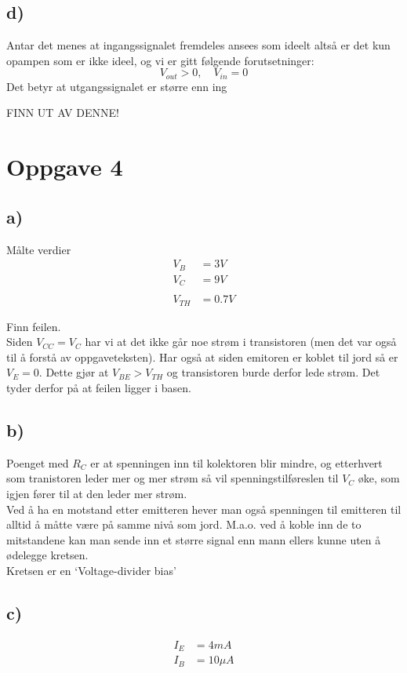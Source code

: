 \documentclass[a4paper, norsk, twoside, 10pt]{article}
\begin{document}
\subsection*{d)}
Antar det menes at ingangssignalet fremdeles ansees som ideelt altså er det kun opampen som er ikke ideel, og vi er gitt følgende forutsetninger: \[V_{out} > 0, \quad V_{in} = 0\]
Det betyr at utgangssignalet er større enn ing


FINN UT AV DENNE!



\section*{Oppgave 4}
\subsection*{a)}
Målte verdier
\begin{align*}
V_{B} &= 3V\\
V_{C} &= 9V\\
\\
V_{TH} &= 0.7V
\end{align*}

Finn feilen.\\
Siden $V_{CC} = V_{C}$ har vi at det ikke går noe strøm i transistoren (men det var også til å forstå av oppgaveteksten). Har også at siden emitoren er koblet til jord så er $V_{E} =0$. Dette gjør at $V_{BE} > V_{TH}$ og transistoren burde derfor lede strøm. Det tyder derfor på at feilen ligger i basen.


\subsection*{b)}
Poenget med $R_{C}$ er at spenningen inn til kolektoren blir mindre, og etterhvert som tranistoren leder mer og mer strøm så vil spenningstilføreslen til $V_{C}$ øke, som igjen fører til at den leder mer strøm.
\\
Ved å ha en motstand etter emitteren hever man også spenningen til emitteren til alltid å måtte være på samme nivå som jord. M.a.o. ved å koble inn de to mitstandene kan man sende inn et større signal enn mann ellers kunne uten å ødelegge kretsen.
\\
Kretsen er en `Voltage-divider bias'




\subsection*{c)}
\begin{align*}
  I_{E} &= 4mA\\
  I_{B} &= 10\mu A
\end{align*}
\end{document}
